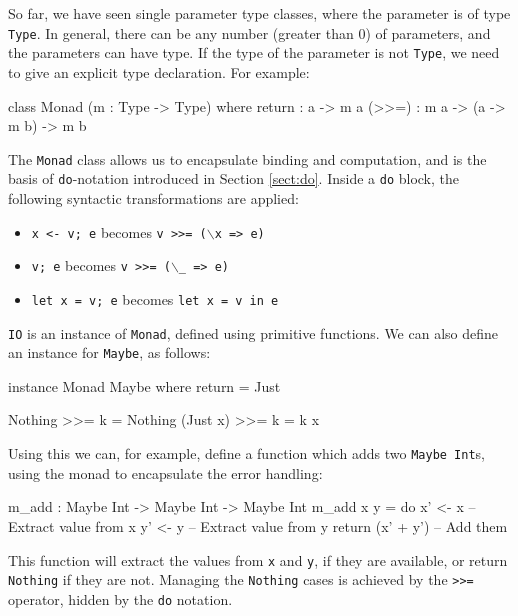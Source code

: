 \label{sec:monad}

So far, we have seen single parameter type classes, where the parameter is of type
\texttt{Type}. In general, there can be any number (greater than 0) of parameters,
and the parameters can have  type.
If the type of the parameter is not \texttt{Type}, we need to give an explicit type
declaration. For example:

\begin{code}
class Monad (m : Type -> Type) where
    return : a -> m a
    (>>=)  : m a -> (a -> m b) -> m b
\end{code}

\noindent
The \texttt{Monad} class allows us to encapsulate binding and computation, and is the
basis of \texttt{do}-notation introduced in Section \ref{sect:do}. Inside a
\texttt{do} block, the following syntactic transformations are applied:

\begin{itemize}
\item \texttt{x <- v; e} becomes \texttt{v >>= ($\backslash$x => e)}
\item \texttt{v; e} becomes \texttt{v >>= ($\backslash$\_ => e)}
\item \texttt{let x = v; e} becomes \texttt{let x = v in e}
\end{itemize}

\noindent
\texttt{IO} is an instance of \texttt{Monad}, defined using primitive functions.
We can also define an instance for \texttt{Maybe}, as follows:

\begin{code}
instance Monad Maybe where
    return = Just

    Nothing  >>= k = Nothing
    (Just x) >>= k = k x
\end{code}

\noindent
Using this we can, for example, define a function which adds two 
\texttt{Maybe Int}s, using the monad to encapsulate the error handling:

\begin{code}
m_add : Maybe Int -> Maybe Int -> Maybe Int
m_add x y = do x' <- x -- Extract value from x
               y' <- y -- Extract value from y
               return (x' + y') -- Add them 
\end{code}

\noindent
This function will extract the values from \texttt{x} and \texttt{y}, if they
are available, or return \texttt{Nothing} if they are not. Managing the
\texttt{Nothing} cases is achieved by the \texttt{>>=} operator, hidden by the
\texttt{do} notation.

